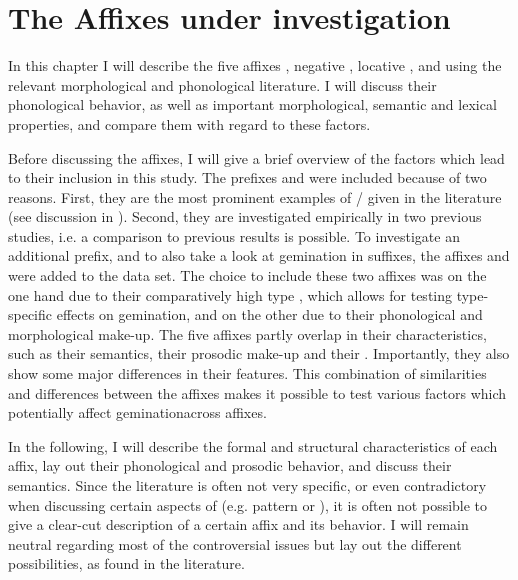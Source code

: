 
\chapter{The Affixes under investigation}{\label{affixes}}


In this chapter I will describe the five affixes , negative , locative ,  and  using the relevant morphological and phonological literature. I will discuss their phonological behavior, as well as important morphological, semantic and lexical properties, and compare them with regard to these factors.

Before discussing the affixes, I will give a brief overview of the factors which lead to their inclusion in this study.
The prefixes  and  were included because of two reasons.
First, they are the most prominent examples of / given in the literature (see discussion in ).  Second, they are investigated empirically in two previous studies, i.e. a comparison to previous results is possible. 
To investigate an additional prefix, and to also take a look at {gemination} in suffixes, the affixes  and   were added to the data set. The choice to include these two affixes was on the one hand due to their comparatively high type , which allows for testing type-specific effects on {gemination}, and  on the other due to their phonological and morphological make-up.
The five affixes partly overlap in their characteristics, such as their semantics, their prosodic make-up and their . Importantly, they also show some major differences in their features. This combination of similarities and differences between the affixes makes it possible to test various factors which potentially affect geminationacross affixes.

In the following, I will describe the formal and structural characteristics of each affix, lay out their phonological and prosodic behavior, and discuss their semantics. Since the literature is often not very specific, or even contradictory when discussing certain aspects of  (e.g.  pattern or ), it is often not possible to give a clear-cut description of a certain affix and its behavior. I will remain neutral regarding most of the controversial issues but lay out the different possibilities, as found in the literature.  

